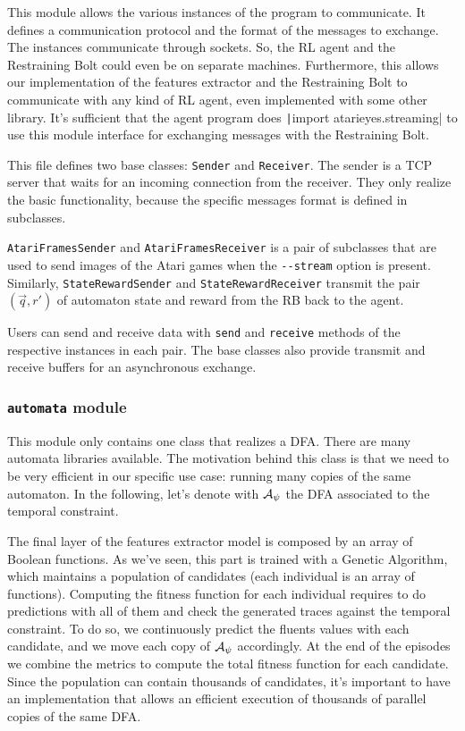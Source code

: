 This module allows the various instances of the program to communicate. It
defines a communication protocol and the format of the messages to exchange.
The instances communicate through sockets. So, the RL agent and the
Restraining Bolt could even be on separate machines. Furthermore, this allows
our implementation of the features extractor and the Restraining Bolt to
communicate with any kind of RL agent, even implemented with some other
library. It's sufficient that the agent program does
\texttt|import atarieyes.streaming| to use this module
interface for exchanging messages with the Restraining Bolt.

This file defines two base classes: \texttt{Sender} and \texttt{Receiver}.
The sender is a TCP server that waits for an incoming connection from the
receiver. They only realize the basic functionality, because the specific
messages format is defined in subclasses.

\texttt{AtariFramesSender} and \texttt{AtariFramesReceiver} is a pair of
subclasses that are used to send images of the Atari games when the
\verb|--stream| option is present. Similarly, \texttt{StateRewardSender} and
\texttt{StateRewardReceiver} transmit the pair $(\vec{q}, r')$ of automaton
state and reward from the RB back to the agent.

Users can send and receive data with \texttt{send} and \texttt{receive}
methods of the respective instances in each pair.  The base classes also
provide transmit and receive buffers for an asynchronous exchange. 


\subsubsection*{\texttt{automata} module}

This module only contains one class that realizes a DFA. There are many
automata libraries available. The motivation behind this class is that we need
to be very efficient in our specific use case: running many copies of the same
automaton. In the following, let's denote with $\mathcal{A}_\psi$ the
DFA associated to the temporal constraint.

The final layer of the features extractor model is composed by an array of
Boolean functions. As we've seen, this part is trained with a Genetic
Algorithm, which maintains a population of candidates (each individual is an
array of functions). Computing the fitness function for each individual
requires to do predictions with all of them and check the generated traces
against the temporal constraint. To do so, we continuously predict the fluents
values with each candidate, and we move each copy of $\mathcal{A}_\psi$
accordingly. At the end of the episodes we combine the metrics to compute the
total fitness function for each candidate. Since the population can contain
thousands of candidates, it's important to have an implementation that allows
an efficient execution of thousands of parallel copies of the same DFA. 

